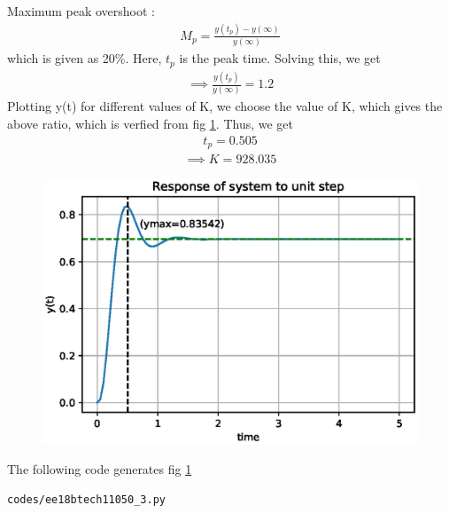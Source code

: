 \begin{enumerate}[label=\thesection.\arabic*.,ref=\thesection.\theenumi]
Maximum peak overshoot :
\begin{align}
    M_p = \frac{y(t_p) - y(\infty)}{y(\infty)}
    \label{eq:ee18btech11050_15}
\end{align}
which is given as 20\%.
Here, $t_p$ is the peak time. Solving this, we get
\begin{align}
    \implies \frac{y(t_p)}{y(\infty)} = 1.2
    \label{eq:ee18btech11050_15}
\end{align}
Plotting y(t) for different values of K, we choose the value of K, which gives the above ratio, which is verfied from fig \ref{fig:ee18btech11050_fig4}.
Thus, we get 
\begin{align}
    t_p = 0.505
    \label{eq:ee18btech11050_16}
\end{align}
\begin{align}
    \implies K = 928.035
    \label{eq:ee18btech11050_17}
\end{align}



\begin{figure}[!ht]
\centering
\includegraphics[width=\columnwidth]{./figs/ee18btech11050/ee18btech11050_3.eps}
\caption{}
\label{fig:ee18btech11050_fig4}
\end{figure}

The following code generates fig \ref{fig:ee18btech11050_fig4}
\begin{lstlisting}
codes/ee18btech11050_3.py
\end{lstlisting}

\end{enumerate}
